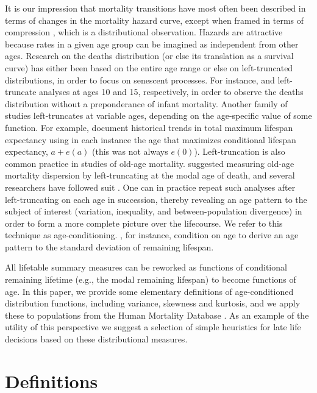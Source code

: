 \documentclass{article}
\begin{document}
It is our impression that mortality transitions have most
often been described in terms of changes in the mortality hazard curve, except
when framed in terms of compression \citep[e.g.,][]{fries1980aging}, which is a
distributional observation.
Hazards are attractive because rates in a given
age group can be imagined as independent from other ages. Research on
the deaths distribution (or else its translation as a survival curve) has either
been based on the entire age range
\citep[e.g.,][]{wilmoth1999rectangularization}
or else on left-truncated distributions, in order to focus on senescent
processes.
For instance, \citet{edwards2005inequality} and \citet{gillespie2014divergence} left-truncate analyses at
ages 10 and 15, respectively, in order to observe the deaths distribution
without a preponderance of infant mortality. Another family of studies
left-truncates at variable ages, depending on the age-specific value of some
function. For example, \citet{romo2009maximum} document historical trends in
total maximum lifespan expectancy using in each instance the age that maximizes 
conditional lifespan expectancy, $a + e(a)$ (this was not
always $e(0)$). Left-truncation is also common practice in studies of old-age
mortality.
\citet{kannisto2001mode} suggested measuring old-age mortality dispersion by
left-truncating at the modal age of death, and several researchers have followed
suit \citep[e.g.,][among others]{Thatcher_22_17,Ouellette_25_19}. One can in
practice repeat such analyses after left-truncating on each age in
succession, thereby revealing an age pattern to the subject of interest (variation, inequality, and
between-population divergence) in order to form a more complete picture over
the lifecourse. We refer to this technique as age-conditioning.
\citet{engelman2010implications}, for instance, condition on age to derive an
age pattern to the standard deviation of remaining lifespan.

All lifetable
summary measures can be reworked as functions of conditional remaining lifetime
(e.g., the modal remaining lifespan) to become functions of age.
In this paper, we provide some elementary definitions of age-conditioned
distribution functions, including variance, skewness and kurtosis, and we apply
these to populations from the Human Mortality Database .
As an example of the utility of this perspective we suggest a selection of
simple heuristics for late life decisions based on these distributional measures.

\section*{Definitions}
\end{document}
